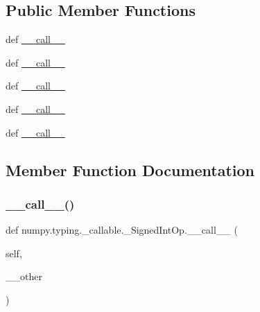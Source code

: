 \subsection*{Public Member Functions}
\begin{DoxyCompactItemize}
\item 
def \hyperlink{classnumpy_1_1typing_1_1__callable_1_1__SignedIntOp_a7b6807e2e32ab2aa2fc918a2fc1a861c}{\+\_\+\+\_\+call\+\_\+\+\_\+}
\item 
def \hyperlink{classnumpy_1_1typing_1_1__callable_1_1__SignedIntOp_a7b6807e2e32ab2aa2fc918a2fc1a861c}{\+\_\+\+\_\+call\+\_\+\+\_\+}
\item 
def \hyperlink{classnumpy_1_1typing_1_1__callable_1_1__SignedIntOp_a7b6807e2e32ab2aa2fc918a2fc1a861c}{\+\_\+\+\_\+call\+\_\+\+\_\+}
\item 
def \hyperlink{classnumpy_1_1typing_1_1__callable_1_1__SignedIntOp_a7b6807e2e32ab2aa2fc918a2fc1a861c}{\+\_\+\+\_\+call\+\_\+\+\_\+}
\item 
def \hyperlink{classnumpy_1_1typing_1_1__callable_1_1__SignedIntOp_a7b6807e2e32ab2aa2fc918a2fc1a861c}{\+\_\+\+\_\+call\+\_\+\+\_\+}
\end{DoxyCompactItemize}


\subsection{Member Function Documentation}
\mbox{\label{classnumpy_1_1typing_1_1__callable_1_1__SignedIntOp_a7b6807e2e32ab2aa2fc918a2fc1a861c}} 
\subsubsection{\texorpdfstring{\+\_\+\+\_\+call\+\_\+\+\_\+()}{\_\_call\_\_()}\hspace{0.1cm}{\footnotesize\ttfamily [1/5]}}
{\footnotesize\ttfamily def numpy.\+typing.\+\_\+callable.\+\_\+\+Signed\+Int\+Op.\+\_\+\+\_\+call\+\_\+\+\_\+ (\begin{DoxyParamCaption}\item[{}]{self,  }\item[{}]{\+\_\+\+\_\+other }\end{DoxyParamCaption})}

